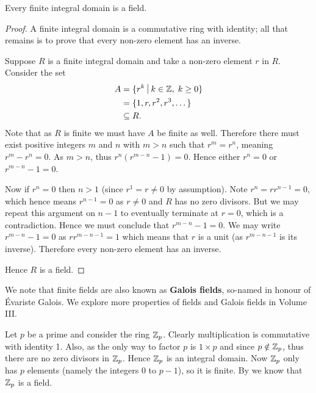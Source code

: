 \begin{theorem}\label{thrm-finite-integral-domain-is-field}
    Every finite integral domain is a field.
\end{theorem}
\begin{proof}
    A finite integral domain is a commutative ring with identity; all that remains is to prove that every non-zero element has an inverse.

    Suppose $R$ is a finite integral domain and take a non-zero element $r$ in $R$. Consider the set
    \begin{align*}
        A &= \{r^k \vert k \in \Z,\;k\geq 0\}\\
        &= \{1, r, r^2, r^3, \dots\}\\
        &\subseteq R.
    \end{align*}
    Note that as $R$ is finite we must have $A$ be finite as well. Therefore there must exist positive integers $m$ and $n$ with $m > n$ such that $r^m = r^n$, meaning $r^m - r^n = 0$. As $m > n$, thus $r^n\left(r^{m-n}-1\right) = 0$. Hence either $r^n = 0$ or $r^{m-n} - 1 = 0$.

    Now if $r^n = 0$ then $n > 1$ (since $r^1 = r \neq 0$ by assumption). Note $r^n = rr^{n-1} = 0$, which hence means $r^{n-1} = 0$ as $r \neq 0$ and $R$ has no zero divisors. But we may repeat this argument on $n - 1$ to eventually terminate at $r = 0$, which is a contradiction. Hence we must conclude that $r^{m-n} - 1 = 0$. We may write $r^{m-n}-1 = 0$ as $rr^{m-n-1} = 1$ which means that $r$ is a unit (as $r^{m-n-1}$ is its inverse). Therefore every non-zero element has an inverse.

    Hence $R$ is a field.
\end{proof}

\begin{remark}
    We note that finite fields are also known as \textbf{Galois fields}, so-named in honour of \'{E}variste Galois. We explore more properties of fields and Galois fields in Volume III.
\end{remark}

\begin{example}
    Let $p$ be a prime and consider the ring $\mathbb{Z}_{p}$. Clearly multiplication is commutative with identity 1. Also, as the only way to factor $p$ is $1 \times p$ and since $p \notin \mathbb{Z}_{p}$, thus there are no zero divisors in $\mathbb{Z}_{p}$. Hence $\mathbb{Z}_{p}$ is an integral domain. Now $\mathbb{Z}_{p}$ only has $p$ elements (namely the integers 0 to $p - 1$), so it is finite. By  we know that $\mathbb{Z}_{p}$ is a field.
\end{example}

